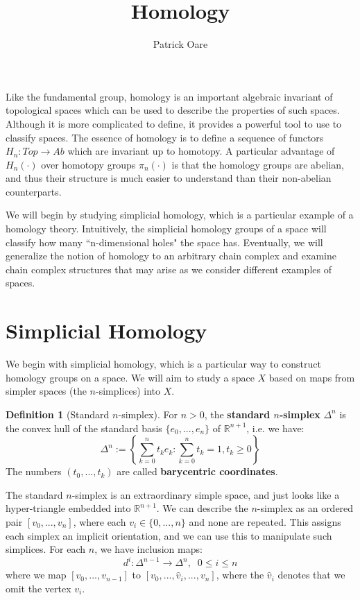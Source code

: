\documentclass[11pt, oneside]{amsart}   	%
\title{Homology}
\author{Patrick Oare}
\date{}							%
\theoremstyle{definition}
\newtheorem{definition}{Definition}[section]
\begin{document}
\maketitle

Like the fundamental group, homology is an important algebraic invariant of topological spaces which can 
be used to describe the properties of such spaces. Although it is more complicated to define, it provides 
a powerful tool to use to classify spaces. The essence of homology is to define a sequence of functors 
$H_n : Top\rightarrow Ab$ which are invariant up to homotopy. A particular advantage of $H_n(\cdot)$ 
over homotopy groups $\pi_n(\cdot)$ is that the homology groups are abelian, and thus their structure 
is much easier to understand than their non-abelian counterparts. 

We will begin by studying simplicial homology, which is a particular example of a homology theory. Intuitively, 
the simplicial homology groups of a space will classify how many ``n-dimensional holes" the space has. 
Eventually, we will generalize the notion of homology to an arbitrary chain complex and examine 
chain complex structures that may arise as we consider different examples of spaces. 

\section{Simplicial Homology}

We begin with simplicial homology, which is a particular way to construct homology groups on a space. We 
will aim to study a space $X$ based on maps from simpler spaces (the $n$-simplices) into $X$.

\begin{definition}[Standard $n$-simplex]
	For $n > 0$, the \textbf{standard $n$-simplex} $\Delta^n$ is the convex hull of the standard basis 
	$\{e_0, ..., e_n\}$ of $\mathbb R^{n + 1}$, i.e. we have:
	\begin{equation}
		\Delta^n := \left\{\sum_{k = 0}^n t_k e_k : \sum_{k = 0}^n t_k = 1, t_k\geq 0\right\}
	\end{equation}
	The numbers $(t_0, ..., t_k)$ are called \textbf{barycentric coordinates}. 
\end{definition}

The standard $n$-simplex is an extraordinary simple space, and just looks like a hyper-triangle embedded 
into $\mathbb R^{n + 1}$. We can describe the $n$-simplex as an ordered pair $[v_0, ..., v_n]$, where 
each $v_i\in \{0, ..., n\}$ and none are repeated. This assigns each simplex an implicit orientation, and 
we can use this to manipulate such simplices. For each $n$, we have inclusion maps:
\begin{equation}
	d^i : \Delta^{n - 1}\rightarrow\Delta^n, \;\; 0\leq i\leq n
\end{equation}
where we map $[v_0, ..., v_{n - 1}]$ to $[v_0, ..., \hat v_i, ..., v_n]$, where the $\hat v_i$ denotes that we 
omit the vertex $v_i$. 
\end{document}
